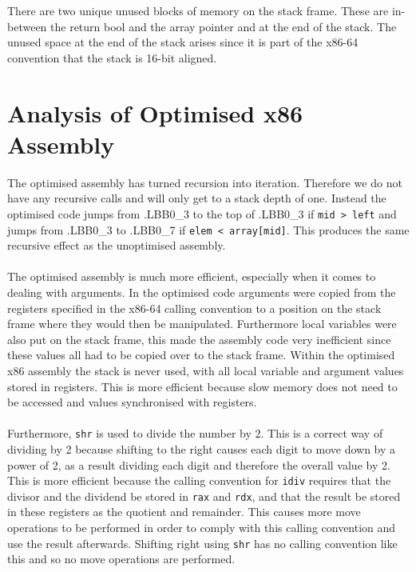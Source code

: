 \documentclass{article}
\begin{document}
\noindent There are two unique unused blocks of memory on the stack frame. These are in-between the return bool and the array pointer and at the end of the stack. The unused space at the end of the stack arises since it is part of the x86-64 convention that the stack is 16-bit aligned.

\section{Analysis of Optimised x86 Assembly}
The optimised assembly has turned recursion into iteration. Therefore we do not have any recursive calls and will only get to a stack depth of one. Instead the optimised code jumps from .LBB0\_3 to the top of .LBB0\_3 if \verb+mid > left+ and jumps from .LBB0\_3 to .LBB0\_7 if \verb+elem < array[mid]+. This produces the same recursive effect as the unoptimised assembly. \\ \\ \noindent The optimised assembly is much more efficient, especially when it comes to dealing with arguments. In the optimised code arguments were copied from the registers specified in the x86-64 calling convention to a position on the stack frame where they would then be manipulated. Furthermore local variables were also put on the stack frame, this made the assembly code very inefficient since these values all had to be copied over to the stack frame. Within the optimised x86 assembly the stack is never used, with all local variable and argument values stored in registers. This is more efficient because slow memory does not need to be accessed and values synchronised with registers. \\ \\ \noindent Furthermore, \verb+shr+ is used to divide the number by 2. This is a correct way of dividing by 2 because shifting to the right causes each digit to move down by a power of 2, as a result dividing each digit and therefore the overall value by 2. This is more efficient because the calling convention for \verb+idiv+ requires that the divisor and the dividend be stored in \verb+rax+ and \verb+rdx+, and that the result be stored in these registers as the quotient and remainder. This causes more move operations to be performed in order to comply with this calling convention and use the result afterwards. Shifting right using \verb+shr+ has no calling convention like this and so no move operations are performed.
\end{document}
